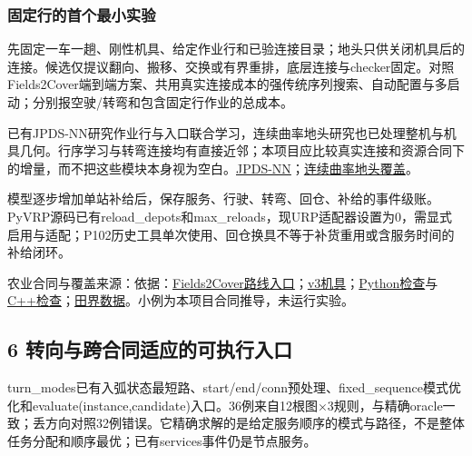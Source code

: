 \documentclass[11pt,a4paper]{article}
\newcommand{\bodytext}[1]{#1\par}
\newcommand{\sourcetext}[1]{{\fontsize{9.2}{14}\selectfont\color{Muted}#1\par}}
\begin{document}
\endgroup
\subsubsection{固定行的首个最小实验}
\bodytext{先固定一车一趟、刚性机具、给定作业行和已验连接目录；地头只供关闭机具后的连接。候选仅提议翻向、搬移、交换或有界重排，底层连接与checker固定。对照Fields2Cover端到端方案、共用真实连接成本的强传统序列搜索、自动配置与多启动；分别报空驶/\allowbreak{}转弯和包含固定行作业的总成本。}
\bodytext{已有JPDS-NN研究作业行与入口联合学习，连续曲率地头研究也已处理整机与机具几何。行序学习与转弯连接均有直接近邻；本项目应比较真实连接和资源合同下的增量，而不把这些模块本身视为空白。\href{https://arxiv.org/html/2503.02369v1}{JPDS-NN}；\href{https://onlinelibrary.wiley.com/doi/10.1002/rob.22489}{连续曲率地头覆盖}。}
\bodytext{模型逐步增加单站补给后，保存服务、行驶、转弯、回仓、补给的事件级账。PyVRP源码已有reload\_\allowbreak{}depots和max\_\allowbreak{}reloads，现URP适配器设置为0，需显式启用与适配；P102历史工具单次使用、回仓换具不等于补货重用或含服务时间的补给闭环。}
\sourcetext{农业合同与覆盖来源：依据：\href{https://github.com/Fields2Cover/Fields2Cover/blob/93c0989ab2fc4a3f3d0a18bbd224d0e267a03fcc/src/fields2cover/route\_planning/route\_planner\_base.cpp\#L159-L190}{Fields2Cover路线入口}；\href{https://github.com/Fields2Cover/Fields2Cover/blob/884d895b59192882476e986ba44ea9143a06a6a9/include/fields2cover/types/GenericImplement.h\#L20-L56}{v3机具}；\href{https://github.com/Fields2Cover/Fields2Cover/blob/93c0989ab2fc4a3f3d0a18bbd224d0e267a03fcc/tests/python/path\_planning/PP\_checker.py\#L19-L26}{Python检查}与\href{https://github.com/Fields2Cover/Fields2Cover/blob/93c0989ab2fc4a3f3d0a18bbd224d0e267a03fcc/tests/cpp/test\_helpers/path\_planning\_checker.hpp\#L71-L93}{C++检查}；\href{https://zenodo.org/records/14524735}{田界数据}。小例为本项目合同推导，未运行实验。}
\subsection{6  转向与跨合同适应的可执行入口}
\bodytext{turn\_\allowbreak{}modes已有入弧状态最短路、start/\allowbreak{}end/\allowbreak{}conn预处理、fixed\_\allowbreak{}sequence模式优化和evaluate(instance,candidate)入口。36例来自12根图×3规则，与精确oracle一致；丢方向对照32例错误。它精确求解的是给定服务顺序的模式与路径，不是整体任务分配和顺序最优；已有services事件仍是节点服务。}
\end{document}

